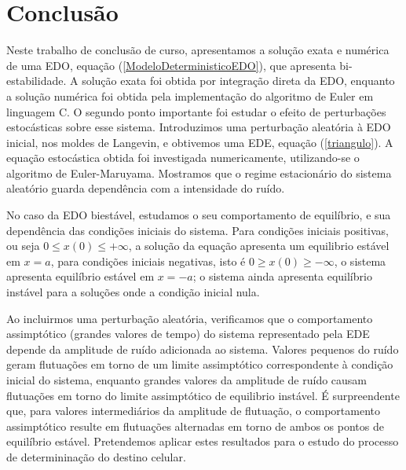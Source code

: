 \chapter{Conclusão}
Neste trabalho de conclusão de curso, apresentamos a solução exata e numérica de uma 
EDO, equação (\ref{ModeloDeterministicoEDO}), que apresenta bi-estabilidade. A solução exata foi obtida por integração direta da EDO, enquanto 
a solução numérica foi obtida pela implementação do algoritmo de Euler em linguagem C. 
O segundo ponto importante foi estudar o efeito de perturbações estocásticas sobre esse sistema. Introduzimos uma perturbação aleatória à EDO inicial, nos moldes de Langevin, e obtivemos uma EDE, equação (\ref{triangulo}). A equação estocástica obtida foi investigada numericamente, utilizando-se o algoritmo de Euler-Maruyama. 
Mostramos que o regime estacionário do sistema aleatório guarda dependência com a intensidade do ruído. 

No caso da EDO biestável, estudamos o seu comportamento de equilíbrio, e sua dependência das 
condições iniciais do sistema. Para condições iniciais positivas, ou seja $0\le x(0) \le +\infty$, 
a solução da equação apresenta um equilibrio estável em $x = a$, para condições iniciais negativas, isto é $ 0 \ge x(0) \ge -\infty$, o sistema apresenta equilíbrio estável em $x=-a$; o sistema ainda apresenta equilíbrio instável para a soluções onde a condição inicial nula.

Ao incluirmos uma perturbação aleatória, verificamos que o comportamento assimptótico (grandes valores de tempo) do
sistema representado pela EDE depende da amplitude de ruído adicionada ao sistema.
Valores pequenos do ruído geram flutuações em torno de um limite assimptótico correspondente à
condição inicial do sistema, enquanto grandes valores da amplitude de ruído causam flutuações
em torno do limite assimptótico de equilibrio instável. É surpreendente que, para valores
intermediários da amplitude de flutuação, o comportamento assimptótico resulte em flutuações alternadas em torno
de ambos os pontos de equilíbrio estável. Pretendemos aplicar estes resultados para o estudo do
processo de determininação do destino celular.